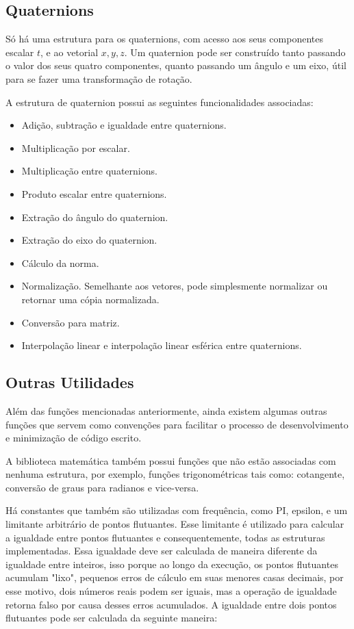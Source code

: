 \subsection{Quaternions}

Só há uma estrutura para os quaternions, com acesso aos seus componentes escalar $t$, e 
ao vetorial $x,y,z$. Um quaternion pode ser construído tanto passando o valor dos seus 
quatro componentes, quanto passando um ângulo e um eixo, útil para se fazer uma 
transformação de rotação.

A estrutura de quaternion possui as seguintes funcionalidades associadas:
\begin{itemize}
    \item Adição, subtração e igualdade entre quaternions.
    \item Multiplicação por escalar.
    \item Multiplicação entre quaternions.
    \item Produto escalar entre quaternions.
    \item Extração do ângulo do quaternion.
    \item Extração do eixo do quaternion.
    \item Cálculo da norma.
    \item Normalização. Semelhante aos vetores, pode simplesmente normalizar ou retornar 
        uma cópia normalizada.
    \item Conversão para matriz.
    \item Interpolação linear e interpolação linear esférica entre quaternions.
\end{itemize}

\subsection{Outras Utilidades}

Além das funções mencionadas anteriormente, ainda existem algumas outras funções que 
servem como convenções para facilitar o processo de desenvolvimento e minimização de 
código escrito.

A biblioteca matemática também possui funções que não estão associadas com nenhuma 
estrutura, por exemplo, funções trigonométricas tais como: cotangente, conversão de 
graus para radianos e vice-versa.

Há constantes que também são utilizadas com frequência, como PI, epsilon, e um limitante 
arbitrário de pontos flutuantes. Esse limitante é utilizado para calcular a igualdade 
entre pontos flutuantes e consequentemente, todas as estruturas implementadas. Essa 
igualdade deve ser calculada de maneira diferente da igualdade entre inteiros, isso 
porque ao longo da execução, os pontos flutuantes acumulam "lixo", pequenos erros de 
cálculo em suas menores casas decimais, por esse motivo, dois números reais podem ser 
iguais, mas a operação de igualdade retorna falso por causa desses erros acumulados. A 
igualdade entre dois pontos flutuantes pode ser calculada da seguinte maneira: 

